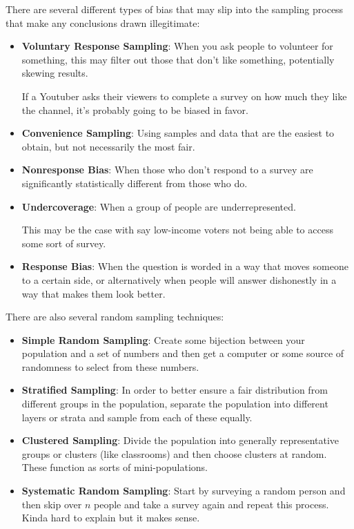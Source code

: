 There are several different types of bias that may slip into the sampling
process that make any conclusions drawn illegitimate:
\begin{itemize}
    \item \textbf{Voluntary Response Sampling}: When you ask people to
        volunteer for something, this may filter out those that don't like
        something, potentially skewing results.

        If a Youtuber asks their viewers to complete a survey on how much they
        like the channel, it's probably going to be biased in favor.

    \item \textbf{Convenience Sampling}: Using samples and data that are the
        easiest to obtain, but not necessarily the most fair.

    \item \textbf{Nonresponse Bias}: When those who don't respond to a survey
        are significantly statistically different from those who do.

    \item \textbf{Undercoverage}: When a group of people are underrepresented.

        This may be the case with say low-income voters not being able to
        access some sort of survey.

    \item \textbf{Response Bias}: When the question is worded in a way that
        moves someone to a certain side, or alternatively when people will
        answer dishonestly in a way that makes them look better.
\end{itemize}

There are also several random sampling techniques:
\begin{itemize}
    \item \textbf{Simple Random Sampling}: Create some bijection between your
        population and a set of numbers and then get a computer or some source
        of randomness to select from these numbers.
    
    \item \textbf{Stratified Sampling}: In order to better ensure a fair
        distribution from different groups in the population, separate the
        population into different layers or strata and sample from each of
        these equally.

    \item \textbf{Clustered Sampling}: Divide the population into generally
        representative groups or clusters (like classrooms) and then choose
        clusters at random. These function as sorts of mini-populations.

    \item \textbf{Systematic Random Sampling}: Start by surveying a random
        person and then skip over \( n \) people and take a survey again and
        repeat this process. Kinda hard to explain but it makes sense.
\end{itemize}

